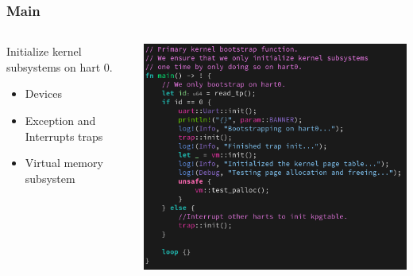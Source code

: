 \documentclass{beamer}
\begin{document}
\begin{frame}
  \frametitle{Main}
  \begin{columns}
    \begin{column}{0.5\textwidth}
      Initialize kernel subsystems on hart 0.
      \begin{itemize}
      \item Devices\\
      \item Exception and Interrupts traps\\
      \item Virtual memory subsystem
      \end{itemize}
    \end{column}
    \begin{column}{0.5\textwidth}
      \includegraphics[width=\textwidth]{main.png}
    \end{column}
  \end{columns}
\end{frame}
\end{document}
